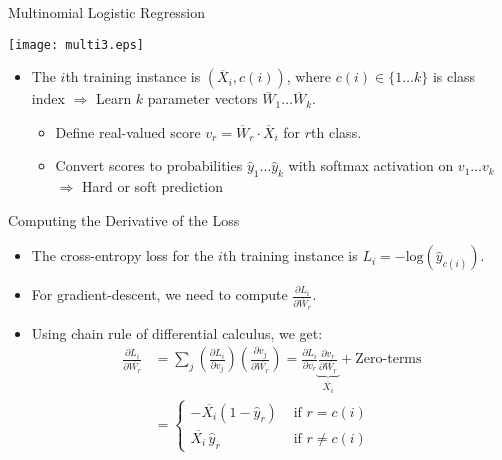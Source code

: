 \begin{frame}{Multinomial Logistic Regression}
\begin{center}
\texttt{[image: multi3.eps]}
\end{center}
\begin{itemize}
\item The $i$th training instance is $(\overline{X}_i, c(i))$,
where $c(i) \in \{ 1 \ldots k\}$ is class index $\Rightarrow$ Learn
$k$ parameter vectors $\overline{W}_1 \ldots \overline{W}_k$.
\begin{itemize}
\item
Define real-valued score $v_r = \overline{W}_r \cdot \overline{X}_i$
for $r$th class.
\item Convert scores to probabilities $\hat{y}_1 \ldots \hat{y}_k$ with softmax activation on
$v_1 \ldots v_k$ $\Rightarrow$ Hard or soft prediction
\end{itemize}
\end{itemize}
\end{frame}


\begin{frame}{Computing the Derivative of the Loss}
\begin{itemize}
\item The cross-entropy loss for the $i$th training instance is
$L_i=-\mbox{log}(\hat{y}_{c(i)})$.
\item For gradient-descent, we need to compute $\frac{\partial
L_i}{\partial \overline{W}_r}$.
\item Using chain rule of differential calculus, we get:
\begin{align*}
\frac{\partial L_i}{\partial \overline{W_r}} &=\sum_j  \left( \frac{\partial L_i}{\partial v_j} \right) \left( \frac{\partial v_j}{\partial \overline{W_r}} \right) = \frac{\partial L_i}{\partial v_r} \underbrace{\frac{\partial v_r}{\partial \overline{W_r}}}_{\overline{X_i}} + \mbox{Zero-terms} \\
 &= \begin{cases}
-\overline{X_i}(1 -\hat{y}_r) & \mbox{ if $r= c(i)$}\\
\overline{X_i} \, \hat{y}_r & \mbox{ if $r \not=c(i)$}
\end{cases} \label{2softgrad}
\end{align*}
\end{itemize}
\end{frame}


